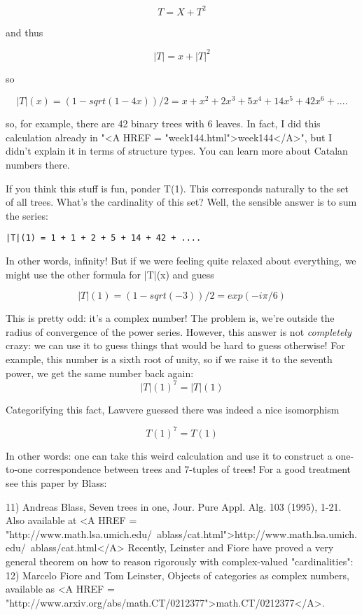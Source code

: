 $$
T = X + T^{2}
$$
    
and thus

$$
|T| = x + |T|^{2}
$$
    
so 

$$
|T|(x) = (1 - sqrt(1 - 4x))/2 

       =  x + x^{2} + 2x^{3} + 5x^{4} + 14x^{5} + 42x^{6} + ....
$$
    
so, for example, there are 42 binary trees with 6 leaves.  In fact, I did
this calculation already in "<A HREF = "week144.html">week144</A>", but I didn't explain it in terms
of structure types.  You can learn more about Catalan numbers there.

If you think this stuff is fun, ponder T(1).  This
corresponds naturally to the set of all trees. 
What's the cardinality of this set?  Well, the sensible answer
is to sum the series:
\begin{verbatim}
|T|(1) = 1 + 1 + 2 + 5 + 14 + 42 + ....
\end{verbatim}
    
In other words, infinity!  But if we were feeling
quite relaxed about everything, we might use the other formula
for |T|(x) and guess

$$
|T|(1) = (1 - sqrt(-3))/2

       = exp(-i \pi /6)
$$
    
This is pretty odd: it's a complex number!   The problem is, we're
outside the radius of convergence of the power series.
However, this answer is not \emph{completely} crazy: we can use
it to guess things that would be hard to guess otherwise!
For example, this number is a sixth root of unity, so if we
raise it to the seventh power, we get the same
number back again:
$$
|T|(1)^{7} = |T|(1)
$$
    

Categorifying this fact, Lawvere guessed there was indeed a nice
isomorphism 

$$
T(1)^{7} = T(1)
$$
    

In other words: one can take this weird calculation and use it
to construct a one-to-one correspondence between trees and 
7-tuples of trees!  For a good treatment see this paper by Blass:

11) Andreas Blass, Seven trees in one, Jour. Pure Appl. Alg. 103 (1995), 
1-21.  Also available at <A HREF = "http://www.math.lsa.umich.edu/~ablass/cat.html">http://www.math.lsa.umich.edu/~ablass/cat.html</A>
Recently, Leinster and Fiore have proved a very general theorem 
on how to reason rigorously with complex-valued "cardinalities":
12) Marcelo Fiore and Tom Leinster, Objects of categories as
complex numbers, available as <A HREF = "http://www.arxiv.org/abs/math.CT/0212377">math.CT/0212377</A>.

